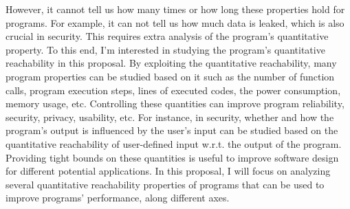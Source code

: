 \begin{abstractpage}
However, it cannot tell us how many times or how long these properties hold for programs.
For example, it can not tell us how much data is leaked, which is also crucial in security. This requires extra analysis
of the program's quantitative property. 
To this end, I'm interested in studying the program's quantitative reachability in this proposal. 
By exploiting the quantitative reachability,
many program properties can be 
studied based on it
such as the number of function calls,
program execution steps,
lines of executed codes,
the power consumption, memory usage, etc. 
Controlling these quantities can improve program reliability, security, privacy, usability, etc.
 For instance, in security, whether and how the program's output is influenced by the user's input
 can be studied based on the 
 quantitative reachability
 of user-defined input w.r.t. the output of the program.
Providing tight bounds on these quantities is useful to improve software design for different potential applications. In this proposal, I will focus on analyzing several quantitative reachability properties of programs that can be used to improve programs' performance, along different axes.


\end{abstractpage}
